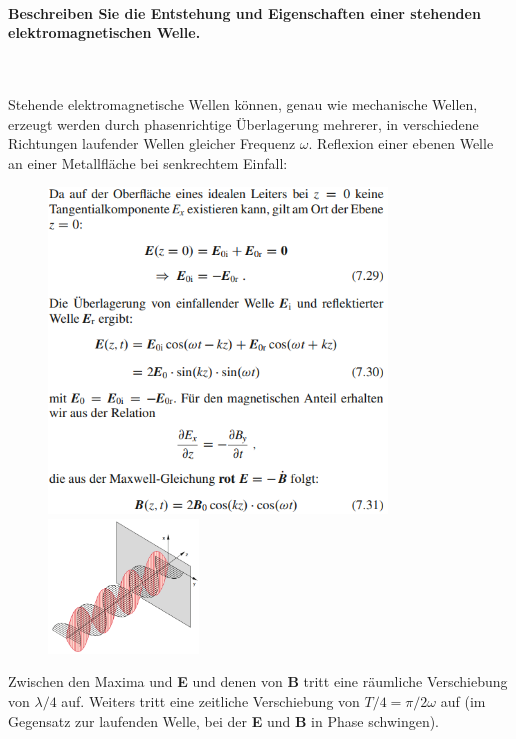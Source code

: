 \documentclass[a4paper, 11pt, ngerman, parskip=half-]{scrartcl}
\begin{document}
\paragraph{Beschreiben Sie die Entstehung und Eigenschaften einer stehenden elektromagnetischen Welle.} ~

Stehende elektromagnetische Wellen können, genau wie mechanische Wellen, erzeugt werden durch
phasenrichtige Überlagerung mehrerer, in verschiedene Richtungen laufender Wellen gleicher Frequenz
$\omega$.
Reflexion einer ebenen Welle an einer Metallfläche bei senkrechtem Einfall:
\begin{figure}[H]
    \centering
    \begin{minipage}[b]{0.3\textwidth}
        \centering
        \includegraphics[width=9cm]{image/13/5.png}
    \end{minipage}
    \hspace{5cm}
    \begin{minipage}[b]{0.3\textwidth}
        \centering
        \includegraphics[width=4cm]{image/13/6.png}
    \end{minipage}
\end{figure}

Zwischen den Maxima und \textbf{E} und denen von \textbf{B} tritt eine räumliche Verschiebung von
$\lambda/4$ auf. Weiters tritt eine zeitliche Verschiebung von $T/4 = \pi / 2 \omega$ auf (im
Gegensatz zur laufenden Welle, bei der \textbf{E} und \textbf{B} in Phase schwingen).
\end{document}
